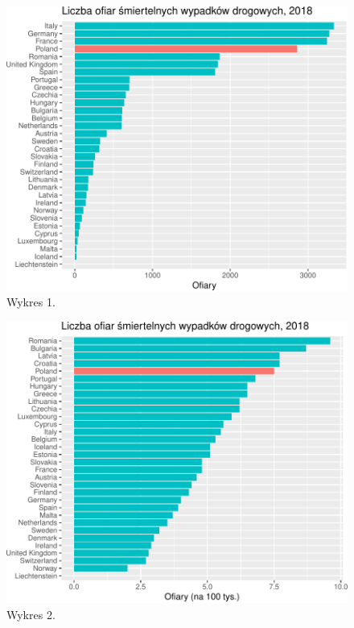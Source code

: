 \documentclass[
]{article}
\begin{document}
\begin{figure}

\includegraphics{raport_wypadki_files/figure-latex/unnamed-chunk-2-1} \hfill{}

\caption{Wykres 1.}\label{fig:unnamed-chunk-2}
\end{figure}

\begin{figure}

\includegraphics{raport_wypadki_files/figure-latex/unnamed-chunk-3-1} \hfill{}

\caption{Wykres 2.}\label{fig:unnamed-chunk-3}
\end{figure}
\end{document}
